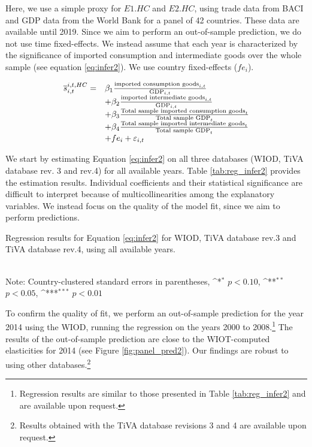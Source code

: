 \documentclass[11pt,a4paper]{paper} %
\begin{document}
Here, we use a simple proxy for $E1.HC$ and $E2.HC$, using trade data from BACI and GDP data from the World Bank for a panel of 42 countries.
These data are available until 2019. 
Since we aim to perform an out-of-sample prediction, we do not use time fixed-effects. We instead assume that each year is characterized by the significance of imported consumption and intermediate goods over the whole sample (see equation \ref{eq:infer2}).
We use country fixed-effects ($fe_{i}$).

 \begin{equation}
	\begin{array}{llll}
		\overline{s}_{i,t}^{i,t,HC}=  &  \beta_1  \frac{\textnormal{imported consumption goods}_{i,t}}{\textnormal{GDP}_{i,t}} \\ & + \beta_2 \frac{\textnormal{imported intermediate goods}_{i,t}}{\textnormal{GDP}_{i,t}} \\
		& +  \beta_3  \frac{\textnormal{Total sample imported consumption goods}_{t}}{\textnormal{Total sample GDP}_{t}} \\
		& + \beta_4 \frac{\textnormal{Total sample imported intermediate goods}_{t}}{\textnormal{Total sample GDP}_{t}} \\
		& +fe_{i}+\varepsilon_{i,t}
	\end{array}
	\label{eq:infer2}
\end{equation}

We start by estimating Equation \ref{eq:infer2} on all three databases (WIOD, TiVA database rev. 3 and rev.4) for all available years.
Table \ref{tab:reg_infer2} provides the estimation results.
Individual coefficients and their statistical significance are difficult to interpret because of multicollinearities among the explanatory variables.
We instead focus on the quality of the model fit, since we aim to perform predictions.



\begin{table}[htbp]\centering
	\def\sym#1{\ifmmode^{#1}\else\(^{#1}\)\fi}
	\caption{Regression results for Equation \ref{eq:infer2} for WIOD, TiVA database rev.3 and TiVA database rev.4, using all available years.}

\\
Note: Country-clustered standard errors in parentheses, \sym{*} \(p<0.10\), \sym{**} \(p<0.05\), \sym{***} \(p<0.01\)
\label{tab:reg_infer2}
\end{table}

To confirm the quality of fit, we perform an out-of-sample prediction for the year 2014 using the WIOD, running the regression on the years 2000 to 2008.\footnote{Regression results are similar to those presented in Table \ref{tab:reg_infer2} and are available upon request.}
The results of the out-of-sample prediction are close to the WIOT-computed elasticities for 2014  (see Figure \ref{fig:panel_pred2}). 
Our findings are robust to using other databases.\footnote{Results obtained with the TiVA database revisions 3 and 4 are available upon request.}
\end{document}

